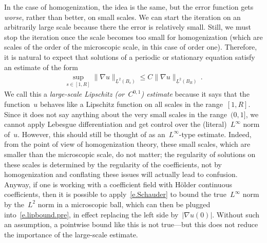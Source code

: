 \documentclass[11pt,twoside]{article} %
\numberwithin{equation}{section}
\theoremstyle{definition}
\begin{document}
\smallskip

In the case of homogenization, the idea is the same, but the error function gets \emph{worse}, rather than better, on small scales. We can start the iteration on an arbitrarily large scale because there the error is relatively small. Still, we must stop the iteration once the scale becomes too small for homogenization (which are scales of the order of the microscopic scale, in this case of order one). Therefore, it is natural to expect that solutions of a periodic or stationary equation satisfy an estimate of the form 
\begin{align}
\label{e.lipbound.pre}
\sup_{s \in [1,R]}
\| \nabla u \|_{\underline{L}^2(B_s)}
\leq 
C \| \nabla u \|_{\underline{L}^2(B_R)} \,.
\end{align}
We call this a \emph{large-scale Lipschitz (or~$C^{0,1}$) estimate} because it says that the function~$u$ behaves like a Lipschitz function on all scales in the range~$[1,R]$. Since it does not say anything about the very small scales in the range~$(0,1]$, we cannot apply Lebesgue differentiation and get control over the (literal)~$L^\infty$ norm of~$u$. However, this should still be thought of as an~$L^\infty$-type estimate. Indeed, from the point of view of homogenization theory, these small scales, which are smaller than the microscopic scale, do not matter; the regularity of solutions on these scales is determined by the regularity of the coefficients, not by homogenization and conflating these issues will actually lead to confusion. 
Anyway, if one is working with a coefficient field with H\"older continuous coefficients, then it is possible to apply~\eqref{e.Schauder} to bound the true~$L^\infty$ norm by the~$L^2$ norm in a microscopic ball, which can then be plugged into~\eqref{e.lipbound.pre}, in effect replacing the left side by~$|\nabla u(0)|$. Without such an assumption, a pointwise bound like this is not true---but this does not reduce the importance of the large-scale estimate. 

\smallskip
\end{document}
